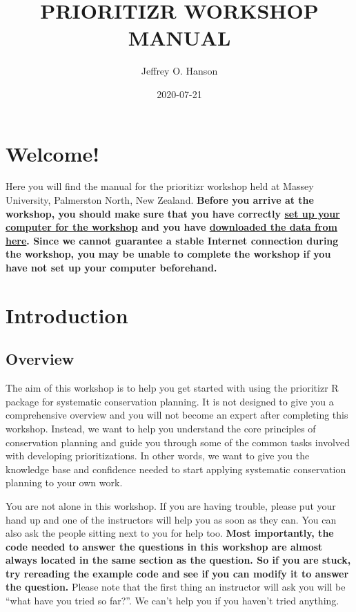\documentclass[12pt,]{book}
\title{PRIORITIZR WORKSHOP MANUAL}
\author{Jeffrey O. Hanson}
\date{2020-07-21}
\begin{document}
\maketitle

{
\hypersetup{linkcolor=black}
\setcounter{tocdepth}{0}
\tableofcontents
}
\chapter{Welcome!}\label{welcome}

Here you will find the manual for the prioritizr workshop held at Massey
University, Palmerston North, New Zealand. \textbf{Before you arrive at
the workshop, you should make sure that you have correctly
\protect\hyperlink{setup}{set up your computer for the workshop} and you
have
\href{https://github.com/prioritizr/massey-workshop/raw/master/data.zip}{downloaded
the data from here}. Since we cannot guarantee a stable Internet
connection during the workshop, you may be unable to complete the
workshop if you have not set up your computer beforehand.}

\chapter{Introduction}\label{introduction}

\section{Overview}\label{overview}

The aim of this workshop is to help you get started with using the
prioritizr R package for systematic conservation planning. It is not
designed to give you a comprehensive overview and you will not become an
expert after completing this workshop. Instead, we want to help you
understand the core principles of conservation planning and guide you
through some of the common tasks involved with developing
prioritizations. In other words, we want to give you the knowledge base
and confidence needed to start applying systematic conservation planning
to your own work.

You are not alone in this workshop. If you are having trouble, please
put your hand up and one of the instructors will help you as soon as
they can. You can also ask the people sitting next to you for help too.
\textbf{Most importantly, the code needed to answer the questions in
this workshop are almost always located in the same section as the
question. So if you are stuck, try rereading the example code and see if
you can modify it to answer the question.} Please note that the first
thing an instructor will ask you will be ``what have you tried so
far?''. We can't help you if you haven't tried anything.
\end{document}
